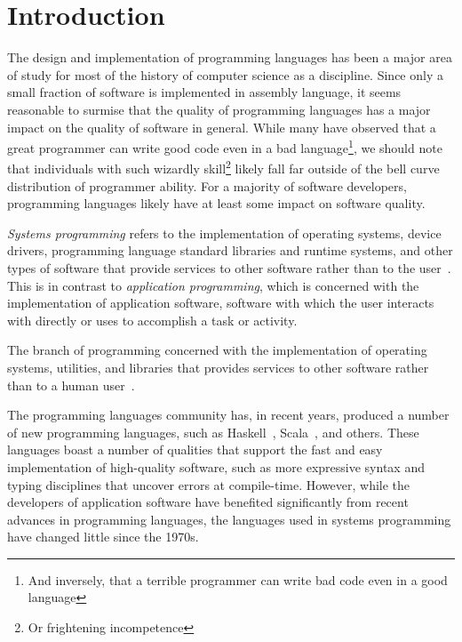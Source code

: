 %
%

\chapter{Introduction}\label{ch:intro} %

The design and implementation of programming languages has been a major area of study for most of the history of computer science as a discipline. Since only a small fraction of software is implemented in assembly language, it seems reasonable to surmise that the quality of programming languages has a major impact on the quality of software in general. While many have observed that a great programmer can write good code even in a bad language\footnote{And inversely, that a terrible programmer can write bad code even in a good language}, we should note that individuals with such wizardly skill\footnote{Or frightening incompetence} likely fall far outside of the bell curve distribution of programmer ability. For a majority of software developers, programming languages likely have at least some impact on software quality.

\textit{Systems programming} refers to the implementation of operating systems, device drivers, programming language standard libraries and runtime systems, and other types of software that provide services to other software rather than to the user~\cite{Narten:2003:SP:1074100.1074850,Shapiro:2006:PLC:1215995.1216004}. This is in contrast to \textit{application programming}, which is concerned with the implementation of application software, software with which the user interacts with directly or uses to accomplish a task or activity.

\begin{defn}
The branch of programming concerned with the implementation of operating systems, utilities, and libraries that provides services to other software rather than to a human user~\cite{Narten:2003:SP:1074100.1074850}.
\end{defn}

The programming languages community has, in recent years, produced a number of new programming languages, such as Haskell~\cite{jones2003haskell,hudak1992report}, Scala~\cite{odersky2004scala,odersky2004overview}, and others. These languages boast a number of qualities that support the fast and easy implementation of high-quality software, such as more expressive syntax and typing disciplines that uncover errors at compile-time. However, while the developers of application software have benefited significantly from recent advances in programming languages, the languages used in systems programming have changed little since the 1970s.

